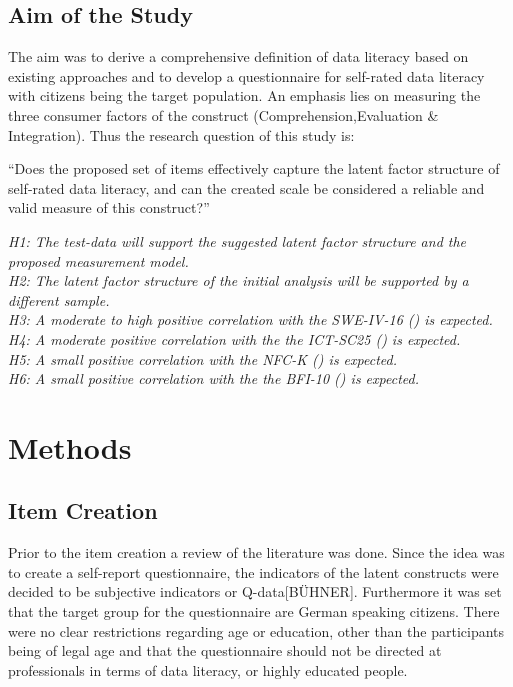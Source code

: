 \documentclass[
  12pt,
  a4paper,
  twoside]{article}
\begin{document}
\subsection{Aim of the Study}\label{aim-of-the-study}

The aim was to derive a comprehensive definition of data literacy based on existing approaches and to develop a questionnaire for self-rated data literacy with citizens being the target population. An emphasis lies on measuring the three consumer factors of the construct (Comprehension,Evaluation \& Integration). Thus the research question of this study is:

``Does the proposed set of items effectively capture the latent factor structure of self-rated data literacy, and can the created scale be considered a reliable and valid measure of this construct?''

\emph{H1: The test-data will support the suggested latent factor structure and the proposed measurement model.}\\
\emph{H2: The latent factor structure of the initial analysis will be supported by a different sample.}\\
\emph{H3: A moderate to high positive correlation with the SWE-IV-16 () is expected.}\\
\emph{H4: A moderate positive correlation with the the ICT-SC25 () is expected.}\\
\emph{H5: A small positive correlation with the NFC-K () is expected.}\\
\emph{H6: A small positive correlation with the the BFI-10 () is expected.}

\section{Methods}\label{methods}

\subsection{Item Creation}\label{item-creation}

Prior to the item creation a review of the literature was done. Since the idea was to create a self-report questionnaire, the indicators of the latent constructs were decided to be subjective indicators or Q-data{[}BÜHNER{]}. Furthermore it was set that the target group for the questionnaire are German speaking citizens. There were no clear restrictions regarding age or education, other than the participants being of legal age and that the questionnaire should not be directed at professionals in terms of data literacy, or highly educated people.
\end{document}

